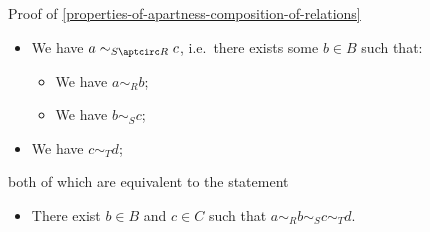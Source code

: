 \begin{Proof}{Proof of \cref{properties-of-apartness-composition-of-relations}}
\begin{itemize}
            \begin{itemize}
                \item We have $a\sim_{S\aptcirc R}c$, i.e.\ there exists some $b\in B$ such that:
                    \begin{itemize}
                        \item We have $a\sim_{R}b$;
                        \item We have $b\sim_{S}c$;
                    \end{itemize}
                \item We have $c\sim_{T}d$;
            \end{itemize}
    \end{itemize}
    both of which are equivalent to the statement
    \begin{itemize}
        \item There exist $b\in B$ and $c\in C$ such that $a\sim_{R}b\sim_{S}c\sim_{T}d$.
    \end{itemize}


\end{Proof}
